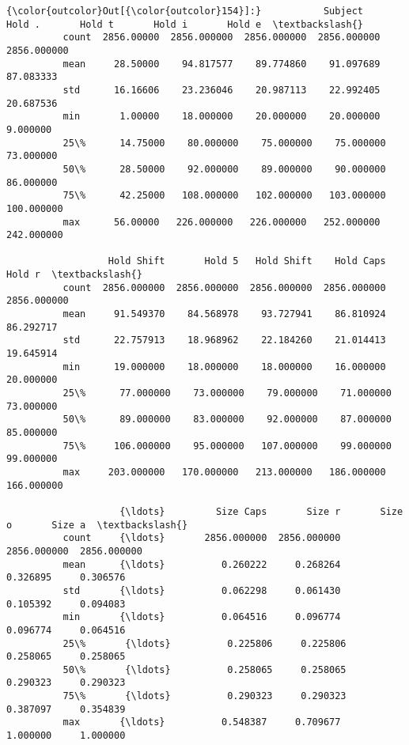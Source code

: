 \documentclass[11pt]{article}
\begin{document}
\begin{Verbatim}[commandchars=\\\{\}]
{\color{outcolor}Out[{\color{outcolor}154}]:}           Subject       Hold .       Hold t       Hold i       Hold e  \textbackslash{}
          count  2856.00000  2856.000000  2856.000000  2856.000000  2856.000000   
          mean     28.50000    94.817577    89.774860    91.097689    87.083333   
          std      16.16606    23.236046    20.987113    22.992405    20.687536   
          min       1.00000    18.000000    20.000000    20.000000     9.000000   
          25\%      14.75000    80.000000    75.000000    75.000000    73.000000   
          50\%      28.50000    92.000000    89.000000    90.000000    86.000000   
          75\%      42.25000   108.000000   102.000000   103.000000   100.000000   
          max      56.00000   226.000000   226.000000   252.000000   242.000000   
          
                  Hold Shift       Hold 5   Hold Shift    Hold Caps       Hold r  \textbackslash{}
          count  2856.000000  2856.000000  2856.000000  2856.000000  2856.000000   
          mean     91.549370    84.568978    93.727941    86.810924    86.292717   
          std      22.757913    18.968962    22.184260    21.014413    19.645914   
          min      19.000000    18.000000    18.000000    16.000000    20.000000   
          25\%      77.000000    73.000000    79.000000    71.000000    73.000000   
          50\%      89.000000    83.000000    92.000000    87.000000    85.000000   
          75\%     106.000000    95.000000   107.000000    99.000000    99.000000   
          max     203.000000   170.000000   213.000000   186.000000   166.000000   
          
                    {\ldots}         Size Caps       Size r       Size o       Size a  \textbackslash{}
          count     {\ldots}       2856.000000  2856.000000  2856.000000  2856.000000   
          mean      {\ldots}          0.260222     0.268264     0.326895     0.306576   
          std       {\ldots}          0.062298     0.061430     0.105392     0.094083   
          min       {\ldots}          0.064516     0.096774     0.096774     0.064516   
          25\%       {\ldots}          0.225806     0.225806     0.258065     0.258065   
          50\%       {\ldots}          0.258065     0.258065     0.290323     0.290323   
          75\%       {\ldots}          0.290323     0.290323     0.387097     0.354839   
          max       {\ldots}          0.548387     0.709677     1.000000     1.000000   
          

\end{Verbatim}
\end{document}
